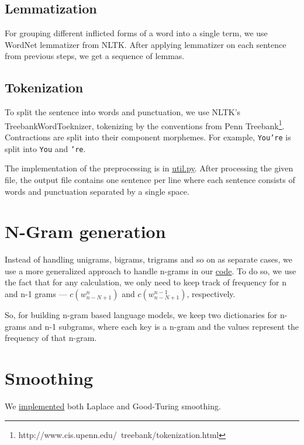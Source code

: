 \documentclass[12pt]{article}
\begin{document}
\subsection{Lemmatization}
For grouping different inflicted forms of a word into a single term, we use
WordNet lemmatizer from NLTK. After applying lemmatizer on each sentence
from previous steps, we get a sequence of lemmas.

\subsection{Tokenization}
To split the sentence into words and punctuation, we use NLTK's
TreebankWordToeknizer, tokenizing by the conventions from Penn
Treebank\footnote{http://www.cis.upenn.edu/~treebank/tokenization.html}.
Contractions are split into their component morphemes. For example,
\texttt{You're} is split into \texttt{You} and \texttt{'re}.

The implementation of the preprocessing is in
\href{https://github.com/saeed-abdullah/cs4740-language-model/blob/master/languagemodel/util.py\#L5}
{util.py}. After processing the given file, the output file contains
one sentence per line where each sentence consists of words and punctuation
separated by a single space.

\section{N-Gram generation}
Instead of handling unigrams, bigrams, trigrams and so on as separate cases, we
use a more generalized approach to handle n-grams in our
\href{https://github.com/saeed-abdullah/cs4740-language-model/blob/master/languagemodel/NGrams.py}
{code}. To do so, we use the fact that for any calculation, we only need to keep
track of frequency for n and n-1 grams --- $c(w_{n-N+1}^{n})$ and 
$c(w_{n-N+1}^{n-1})$, respectively.

So, for building n-gram based language models, we keep two dictionaries for
n-grams and n-1 subgrams, where each key is a n-gram and the values represent
the frequency of that n-gram.

\section{Smoothing}

We \href{https://github.com/saeed-abdullah/cs4740-language-model/blob/master/languagemodel/probability.py}
{implemented} both Laplace and Good-Turing smoothing.
\end{document}
